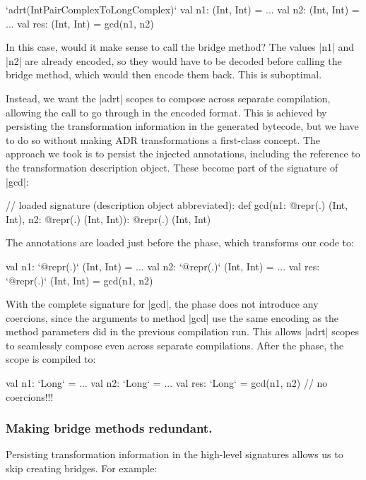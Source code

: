 \begin{lstlisting-nobreak}
`adrt(IntPairComplexToLongComplex)` {
  val n1: (Int, Int) = ...
  val n2: (Int, Int) = ...
  val res: (Int, Int) = gcd(n1, n2)
}
\end{lstlisting-nobreak}

In this case, would it make sense to call the bridge method? The values |n1| and |n2| are already encoded, so they would have to be decoded before calling the bridge method, which would then encode them back. This is suboptimal.

Instead, we want the |adrt| scopes to compose across separate compilation, allowing the call to go through in the encoded format.  This is achieved by persisting the transformation information in the generated bytecode, but we have to do so without making ADR transformations a first-class concept. The approach we took is to persist the injected annotations, including the reference to the transformation description object. These become part of the signature of |gcd|: %

\begin{lstlisting-nobreak}
// loaded signature (description object abbreviated):
def gcd(n1: @repr(.) (Int, Int), n2: @repr(.) (Int, Int)): @repr(.) (Int, Int)
\end{lstlisting-nobreak}

The annotations are loaded just before the \inject{} phase, which transforms our code to:

\begin{lstlisting-nobreak}
val n1: `@repr(.)` (Int, Int) = ...
val n2: `@repr(.)` (Int, Int) = ...
val res: `@repr(.)` (Int, Int) = gcd(n1, n2)
\end{lstlisting-nobreak}

With the complete signature for |gcd|, the \coerce{} phase does not introduce any coercions, since the arguments to method |gcd| use the same encoding as the method parameters did in the previous compilation run. This allows |adrt| scopes to seamlessly compose even across separate compilations. After the \commit{} phase, the scope is compiled to:

\begin{lstlisting-nobreak}
val n1: `Long` = ...
val n2: `Long` = ...
val res: `Long` = gcd(n1, n2) // no coercions!!!
\end{lstlisting-nobreak}

\vspace{-0.45em}
\subsubsection{Making bridge methods redundant.} Persisting transformation information in the high-level signatures allows us to skip creating bridges. For example: %

